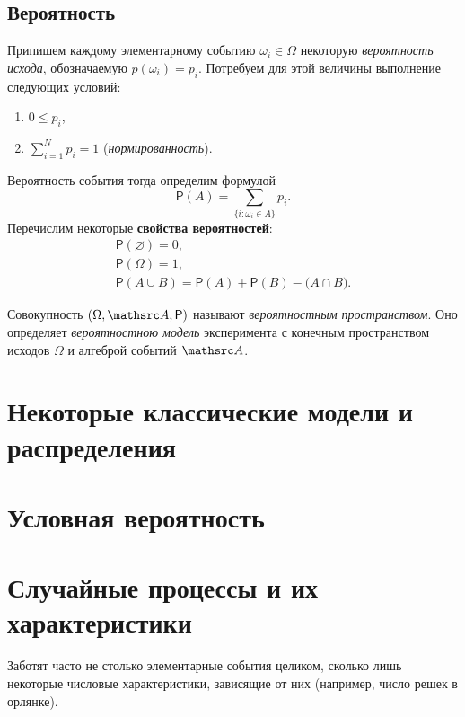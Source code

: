 \subsection{Вероятность}
Припишем каждому элементарному событию $ \omega_i \in \Omega $ некоторую
\emph{вероятность исхода},
обозначаемую $ p(\omega_i) = p_i $. Потребуем для этой величины выполнение
следующих условий: 
\begin{enumerate}
	\item $ 0 \leqslant p_i $,
	\item $\sum_{i=1}^N p_i = 1$ (\emph{нормированность}).
\end{enumerate}
Вероятность события тогда определим формулой 
\[
\mathsf P(A) = \sum_{\{i\colon\omega_i\in A\}} p_i.
\]
Перечислим некоторые \textbf{свойства вероятностей}: 
\begin{gather*}
		\mathsf P (\varnothing) = 0,\\
		\mathsf P (\Omega) = 1,\\
		\mathsf P (A \cup B) = \mathsf P(A) + \mathsf P(B) - \mathsf (A\cap B).
\end{gather*}


\begin{definition}
	Совокупность $ (\Omega, \mathsrc A, \mathsf P) $ называют \emph{вероятностным
	пространством}. Оно определяет \emph{вероятностною модель} эксперимента с
	конечным пространством исходов $ \Omega $ и алгеброй событий $ \mathsrc A $. 
\end{definition}



\section{Некоторые классические модели и распределения}



\section{Условная вероятность}



\section{Случайные процессы и их характеристики}
Заботят часто не столько элементарные события целиком, сколько лишь некоторые
числовые характеристики, зависящие от них (например, число решек в орлянке).

